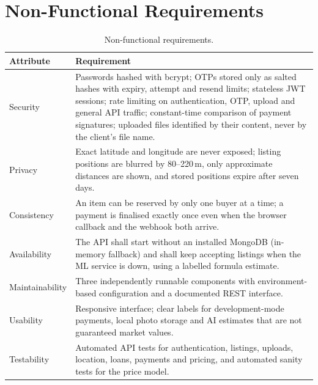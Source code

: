\documentclass[11pt,letterpaper,oneside]{report}
\begin{document}
\section{Non-Functional Requirements}
\begin{table}[H]
\centering
\caption{Non-functional requirements.}\label{tab:nfr}
\small
\begin{tabularx}{\textwidth}{@{}L{2.6cm}X@{}}
\toprule
\textbf{Attribute} & \textbf{Requirement}\\
\midrule
Security & Passwords hashed with bcrypt; OTPs stored only as salted hashes with expiry, attempt and
resend limits; stateless JWT sessions; rate limiting on authentication, OTP, upload and general
API traffic; constant-time comparison of payment signatures; uploaded files identified by their
content, never by the client's file name.\\
Privacy & Exact latitude and longitude are never exposed; listing positions are blurred by 80--220\,m,
only approximate distances are shown, and stored positions expire after seven days.\\
Consistency & An item can be reserved by only one buyer at a time; a payment is finalised exactly once
even when the browser callback and the webhook both arrive.\\
Availability & The API shall start without an installed MongoDB (in-memory fallback) and shall keep
accepting listings when the ML service is down, using a labelled formula estimate.\\
Maintainability & Three independently runnable components with environment-based configuration and a
documented REST interface.\\
Usability & Responsive interface; clear labels for development-mode payments, local photo storage and
AI estimates that are not guaranteed market values.\\
Testability & Automated API tests for authentication, listings, uploads, location, loans, payments and
pricing, and automated sanity tests for the price model.\\
\bottomrule
\end{tabularx}
\end{table}
\end{document}
